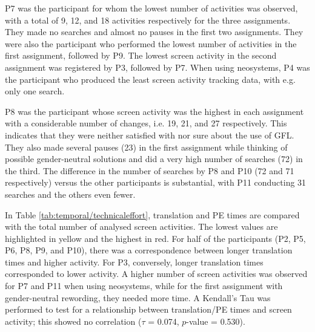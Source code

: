 P7 was the participant for whom the lowest number of activities was observed, with a total of 9, 12, and 18 activities respectively for the three assignments. They made no searches and almost no pauses in the first two assignments. They were also the participant who performed the lowest number of activities in the first assignment, followed by P9. The lowest screen activity in the second assignment was registered by P3, followed by P7. When using neosystems, P4 was the participant who produced the least screen activity tracking data, with e.g. only one search. 

P8 was the participant whose screen activity was the highest in each assignment with a considerable number of changes, i.e. 19, 21, and 27 respectively. This indicates that they were neither satisfied with nor sure about the use of GFL. They also made several pauses (23) in the first assignment while thinking of possible gender-neutral solutions and did a very high number of searches (72) in the third. The difference in the number of searches by P8 and P10 (72 and 71 respectively) versus the other participants is substantial, with P11 conducting 31 searches and the others even fewer.

In Table \ref{tab:temporal/technicaleffort}, translation and PE times are compared with the total number of analysed screen activities. The lowest values are highlighted in yellow and the highest in red. For half of the participants (P2, P5, P6, P8, P9, and P10), there was a correspondence between longer translation times and higher activity. For P3, conversely, longer translation times corresponded to lower activity. A higher number of screen activities was observed for P7 and P11 when using neosystems, while for the first assignment with gender-neutral rewording, they needed more time. A Kendall's Tau was performed to test for a relationship between translation/PE times and screen activity; this showed no correlation ($\tau$ = 0.074, $p$-value = 0.530). 


